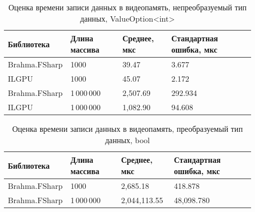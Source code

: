 \begin{table}
    \begin{tabularx}{\textwidth}{|l|l|X|X|}
      \hline
      \textbf{Библиотека} & \textbf{Длина массива} & \textbf{Среднее, мкс} & \textbf{Стандартная ошибка, мкс} \\
      \hline
      Brahma.FSharp & 1000 & 39.47 & 3.677  \\
      ILGPU & 1000 & 45.07   & 2.172   \\
      \hline
      Brahma.FSharp & 1\,000\,000 & 2,507.69  & 292.934  \\
      ILGPU & 1\,000\,000 & 1,082.90 & 94.608 \\
      \hline
    \end{tabularx}
  \caption{Оценка времени записи данных в видеопамять, непреобразуемый тип данных, ValueOption<int>}
  \label{tab:blit-w}
\end{table}

\begin{table}
    \begin{tabularx}{\textwidth}{|X|X|X|X|}
      \hline
      \textbf{Библиотека} & \textbf{Длина массива} & \textbf{Среднее, мкс} & \textbf{Стандартная ошибка, мкс} \\
      \hline
      Brahma.FSharp & 1000 & 2,685.18 & 418.878  \\
      \hline
      Brahma.FSharp & 1\,000\,000 & 2,044,113.55  & 48,098.780\\
      \hline
    \end{tabularx}
  \caption{Оценка времени записи данных в видеопамять, преобразуемый тип данных, bool}
  \label{tab:nonblit-w}
\end{table}



